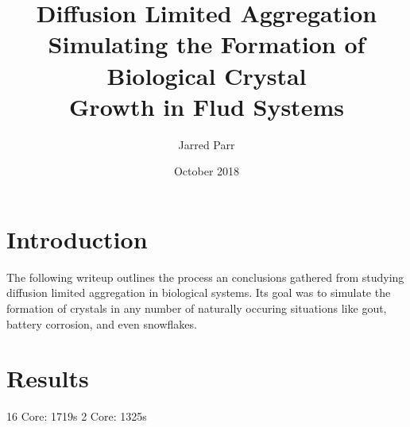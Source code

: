 \documentclass[11pt]{article}
\begin{document}
\title{%
  Diffusion Limited Aggregation \\
  \large Simulating the Formation of Biological Crystal \\
  Growth in Flud Systems}
\author{Jarred Parr}

\date{October 2018}
\maketitle

\section{Introduction}
The following writeup outlines the process an conclusions gathered from studying diffusion limited aggregation in biological systems. Its goal was to simulate the formation of crystals in any number of naturally occuring situations like gout, battery corrosion, and even snowflakes.

\section{Results}

16 Core: 1719s
2 Core: 1325s
\end{document}
